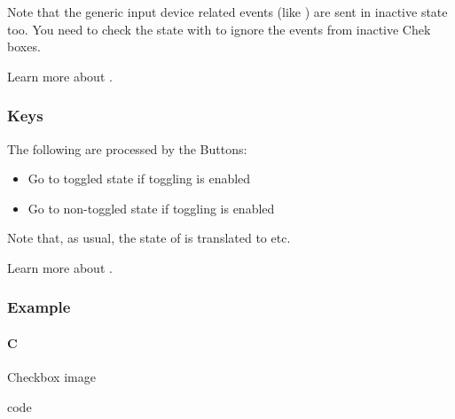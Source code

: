 \documentclass[letterpaper,10pt,english]{sphinxmanual}
\begin{document}
Note that the generic input device related events (like ) are sent in inactive state too. You need to check the state with  to ignore the events from inactive Chek boxes.

Learn more about {\hyperref[\detokenize{overview/events::doc}]{}}.


\subsubsection{Keys}
\label{\detokenize{object-types/cb:keys}}
The following  are processed by the Buttons:
\begin{itemize}
\item {} 
 Go to toggled state if toggling is enabled

\item {} 
 Go to non-toggled state if toggling is  enabled

\end{itemize}

Note that, as usual, the state of  is translated to  etc.

Learn more about {\hyperref[\detokenize{overview/indev::doc}]{}}.


\subsubsection{Example}
\label{\detokenize{object-types/cb:example}}

\paragraph{C}
\label{\detokenize{object-types/cb:c}}
Checkbox image

code
\end{document}
